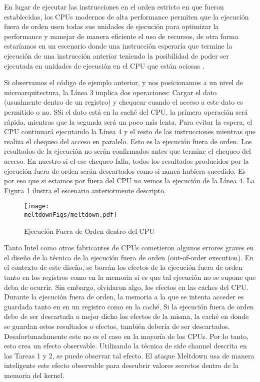 En lugar de ejecutar las instrucciones en el orden estricto en que fueron establecidas, los CPUs modernos de alta performance permiten que la ejecución fuera de orden usen todas sus unidades de ejecución para optimizar la performance y manejar de manera eficiente el uso de recursos, de otra forma estaríamos en un escenario donde una instrucción esperaría que termine la ejecución de una instrucción anterior teniendo la posibilidad de poder ser ejecutada en unidades de ejecución en el CPU que están ociosas \cite{wiki:outoforder}. 

Si observamos el código de ejemplo anterior, y nos posicionamos a un nivel de microarquitectura, la Línea 3 implica dos operaciones: Cargar el dato (usualmente dentro de un registro) y chequear cuando el acceso a este dato es permitido o no. SSi el dato está en la caché del CPU, la primera operación será rápida, mientras que la segunda será un poco más lenta. Para evitar la espera, el CPU continuará ejecutando la Línea 4 y el resto de las instrucciones mientras que realiza el chequeo del acceso en paralelo. Esto es la ejecución fuera de orden. Los resultados de la ejecución no serán confirmados antes que termine el chequeo del acceso. En nuestro si el ese chequeo falla, todos los resultados producidos por la ejecución fuera de orden serán descartados como si nunca hubiera sucedido. Es por eso que si estamos por fuera del CPU no vemos la ejecución de la Línea 4.
La Figura \ref{meltdown:fig:outoforder} ilustra el escenario anteriormente descripto.



\begin{figure}[htb]
\centering
\texttt{[image: \\meltdownFigs/meltdown.pdf]}
\caption{Ejecución Fuera de Orden dentro del CPU}
\label{meltdown:fig:outoforder}
\end{figure}

Tanto Intel como otros fabricantes de CPUs cometieron algunos errores graves en el diseño de la técnica de la ejecución fuera de orden (out-of-order execution).
En el contexto de este diseño, se borrán los efectos de la ejecución fuera de orden tanto en los registros como en la memoria si es que tal ejecución no se supone que deba de ocurrir. Sin embargo, olvidaron algo, los efectos en las caches del CPU.
Durante la ejecución fuera de orden, la memoria a la que se intenta acceder es guardada tanto en en un registro como en la caché. Si la ejecución fuera de orden debe de ser descartada o mejor dicho los efectos de la misma, la caché en donde se guardan estos resultados o efectos, también debería de ser descartados. Desafortunadamente este no es el caso en la mayoría de los CPUs.
Por lo tanto, esto crea un efecto observable.
Utilizando la técnica de side channel descrita en las Tareas 1 y 2,
se puede observar tal efecto. El ataque Meltdown usa de manera inteligente este
efecto observable para descubrir valores secretos dentro de la memoria del kernel.

